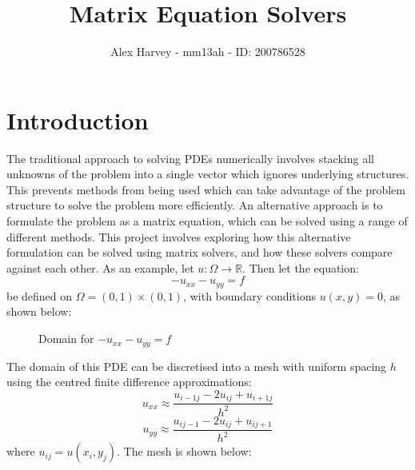 \documentclass{article}
\title{Matrix Equation Solvers}
\author{Alex Harvey - mm13ah - ID: 200786528}
\date{}
\numberwithin{equation}{section}
\begin{document}
\maketitle
\section{Introduction}

The traditional approach to solving PDEs numerically involves stacking all unknowns of the problem into a single vector which ignores underlying structures. This prevents methods from being used which can take advantage of the problem structure to solve the problem more efficiently. An alternative approach is to formulate the problem as a matrix equation, which can be solved using a range of different methods. This project involves exploring how this alternative formulation can be solved using matrix solvers, and how these solvers compare against each other. As an example, let $u: \Omega \to \mathbb{R}$. Then let the equation:
	\begin{equation} 
	-u_{xx} - u_{yy} = f
	\end{equation}
be defined on $\Omega = (0,1) \times(0,1)$, with boundary conditions $u(x,y)=0$, as shown below:

\begin{figure}[H]
\centering
\caption{Domain for $-u_{xx}-u_{yy}=f$}
\end{figure}

The domain of this PDE can be discretised into a mesh with uniform spacing $h$ using the centred finite difference approximations:
	\begin{equation} 
	u_{xx} \approx \frac{u_{i-1j} - 2u_{ij} + u_{i+1j}}{h^2}
	\end{equation}
	\begin{equation}
	u_{yy} \approx \frac{u_{ij-1} - 2u_{ij} + u_{ij+1}}{h^2}
	\end{equation}
where $u_{ij} = u(x_i, y_j)$. The mesh is shown below:
\end{document}
